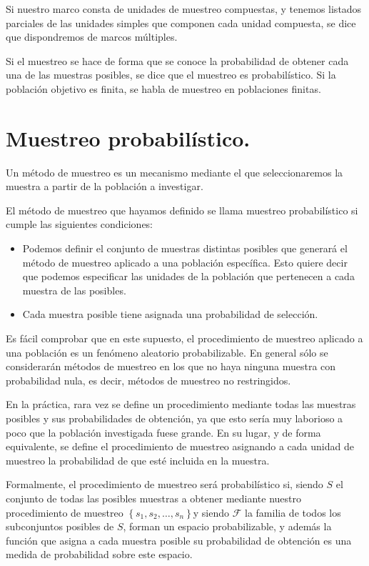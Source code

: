 Si nuestro marco consta de unidades de muestreo compuestas, y tenemos
listados parciales de las unidades simples que componen cada unidad
compuesta, se dice que dispondremos de marcos m\'ultiples.

Si el muestreo se hace de forma que se conoce la probabilidad de obtener
cada una de las muestras posibles, se dice que el muestreo es probabil\'istico.
Si la poblaci\'on objetivo es finita, se habla de muestreo en poblaciones
finitas.


\section{Muestreo probabil\'istico.}

Un m\'etodo de muestreo es un mecanismo mediante el que seleccionaremos
la muestra a partir de la poblaci\'on a investigar.

El m\'etodo de muestreo que hayamos definido se llama muestreo probabil\'istico
si cumple las siguientes condiciones:
\begin{itemize}
\item Podemos definir el conjunto de muestras distintas posibles que generar\'a
el m\'etodo de muestreo aplicado a una poblaci\'on espec\'ifica. Esto quiere
decir que podemos especificar las unidades de la poblaci\'on que pertenecen
a cada muestra de las posibles.
\item Cada muestra posible tiene asignada una probabilidad de selecci\'on. 
\end{itemize}
Es f\'acil comprobar que en este supuesto, el procedimiento de muestreo
aplicado a una poblaci\'on es un fen\'omeno aleatorio probabilizable.
En general s\'olo se considerar\'an m\'etodos de muestreo en los que no
haya ninguna muestra con probabilidad nula, es decir, m\'etodos de muestreo
no restringidos.

En la pr\'actica, rara vez se define un procedimiento mediante todas
las muestras posibles y sus probabilidades de obtenci\'on, ya que esto
ser\'ia muy laborioso a poco que la poblaci\'on investigada fuese grande.
En su lugar, y de forma equivalente, se define el procedimiento de
muestreo asignando a cada unidad de muestreo la probabilidad de que
est\'e incluida en la muestra.

Formalmente, el procedimiento de muestreo ser\'a probabil\'istico si,
siendo $S$ el conjunto de todas las posibles muestras a obtener mediante
nuestro procedimiento de muestreo $\left\{ s_{1},s_{2},\ldots,s_{n}\right\} $y
siendo $\mathcal{F}$ la familia de todos los subconjuntos posibles
de $S$, forman un espacio probabilizable, y adem\'as la funci\'on que
asigna a cada muestra posible su probabilidad de obtenci\'on es una
medida de probabilidad sobre este espacio.


